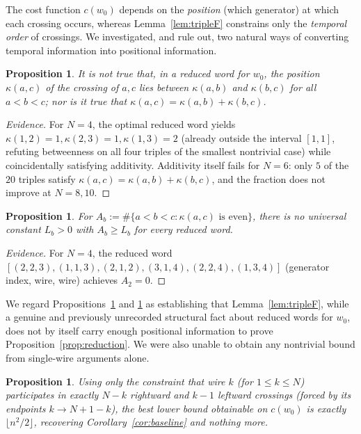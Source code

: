 \documentclass[11pt]{amsart}
\theoremstyle{plain}
\newtheorem{proposition}[theorem]{Proposition}
\theoremstyle{definition}
\theoremstyle{remark}
\begin{document}
The cost function $c(w_0)$ depends on the \emph{position} (which generator) at which each crossing occurs, whereas Lemma~\ref{lem:tripleF} constrains only the \emph{temporal order} of crossings. We investigated, and rule out, two natural ways of converting temporal information into positional information.

\begin{proposition}
\label{prop:betweenness_fails}
It is not true that, in a reduced word for $w_0$, the position $\kappa(a,c)$ of the crossing of $a,c$ lies between $\kappa(a,b)$ and $\kappa(b,c)$ for all $a<b<c$; nor is it true that $\kappa(a,c)=\kappa(a,b)+\kappa(b,c)$.
\end{proposition}

\begin{proof}[Evidence]
For $N=4$, the optimal reduced word yields $\kappa(1,2)=1,\kappa(2,3)=1,\kappa(1,3)=2$ (already outside the interval $[1,1]$, refuting betweenness on all four triples of the smallest nontrivial case) while coincidentally satisfying additivity. Additivity itself fails for $N=6$: only $5$ of the $20$ triples satisfy $\kappa(a,c)=\kappa(a,b)+\kappa(b,c)$, and the fraction does not improve at $N=8,10$.
\end{proof}

\begin{proposition}
\label{prop:aggregate_fails}
For $A_b := \#\{a<b<c : \kappa(a,c) \text{ is even}\}$, there is no universal constant $L_b>0$ with $A_b \ge L_b$ for every reduced word.
\end{proposition}

\begin{proof}[Evidence]
For $N=4$, the reduced word $[(2,2,3),(1,1,3),(2,1,2),(3,1,4),(2,2,4),(1,3,4)]$ (generator index, wire, wire) achieves $A_2=0$.
\end{proof}

We regard Propositions~\ref{prop:betweenness_fails} and \ref{prop:aggregate_fails} as establishing that Lemma~\ref{lem:tripleF}, while a genuine and previously unrecorded structural fact about reduced words for $w_0$, does not by itself carry enough positional information to prove Proposition~\ref{prop:reduction}. We were also unable to obtain any nontrivial bound from single-wire arguments alone.

\begin{proposition}
\label{prop:singlewire}
Using only the constraint that wire $k$ (for $1\le k\le N$) participates in exactly $N-k$ rightward and $k-1$ leftward crossings (forced by its endpoints $k \to N+1-k$), the best lower bound obtainable on $c(w_0)$ is exactly $\lfloor n^2/2\rfloor$, recovering Corollary~\ref{cor:baseline} and nothing more.
\end{proposition}
\end{document}

